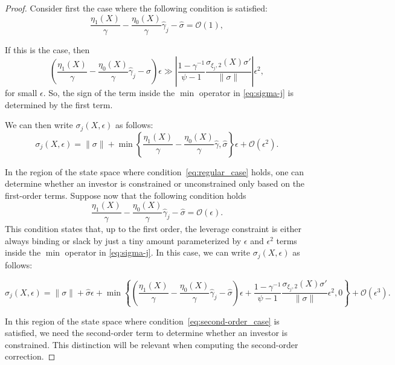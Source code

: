 \begin{proof}
Consider first the case where the following condition is satisfied:
\begin{equation}\label{eq:regular_case}
    \frac{\eta_1(X)}{\gamma}- \frac{\eta_0(X)}{\gamma} \hat{\gamma}_j -\hat{\sigma} = \mathcal{O}(1), 
\end{equation}

If this is the case, then
\begin{equation}
    \left(\frac{\eta_1(X)}{\gamma}- \frac{\eta_0(X)}{\gamma} \hat{\gamma}_j -\hat{\sigma}\right)\epsilon \gg \left|\frac{1-\gamma^{-1}}{\psi-1} \frac{\sigma_{\xi_j,2}(X) \sigma'}{\|\sigma\|} \right| \epsilon^2,
\end{equation}
for small $\epsilon$. So, the sign of the term inside the $ \min $ operator in \eqref{eq:sigma-j} is determined by the first term. 

We can then write $\sigma_{j}(X,\epsilon)$ as follows:
\begin{equation}
    \sigma_{j}(X,\epsilon) = \|\sigma\| +  \min\left\{ \frac{\eta_1(X)}{\gamma}- \frac{\eta_0(X)}{\gamma} \hat{\gamma}, \hat{\sigma}\right\}\epsilon + \mathcal{O}(\epsilon^2).
\end{equation}

In the region of the state space where condition~\eqref{eq:regular_case} holds, one can determine whether an investor is constrained or unconstrained only based on the first-order terms. Suppose now that the following condition holds
\begin{equation}\label{eq:second-order_case}
    \frac{\eta_1(X)}{\gamma}- \frac{\eta_0(X)}{\gamma} \hat{\gamma}_j -\hat{\sigma} = \mathcal{O}(\epsilon).
\end{equation}
This condition states that, up to the first order, the leverage constraint is either always binding or slack by just a tiny amount parameterized by $ \epsilon $ and $ \epsilon^2 $ terms inside the $ \min $ operator in \eqref{eq:sigma-j}. In this case, we can write $\sigma_{j}(X,\epsilon)$ as follows:
\begin{small}
	\begin{equation}
		\sigma_{j}(X,\epsilon) = \|\sigma\| + \hat{\sigma}\epsilon+\min\left\{ \left(\frac{\eta_1(X)}{\gamma}- \frac{\eta_0(X)}{\gamma} \hat{\gamma}_j-\hat{\sigma}\right) \epsilon + \frac{1-\gamma^{-1}}{\psi-1} \frac{\sigma_{\xi_j,2}(X) \sigma'}{\|\sigma\|} \epsilon^2,0\right\} + \mathcal{O}(\epsilon^3).
	\end{equation}
\end{small}
In this region of the state space where condition~\eqref{eq:second-order_case} is satisfied, we need the second-order term to determine whether an investor is constrained. This distinction will be relevant when computing the second-order correction.


\end{proof}
